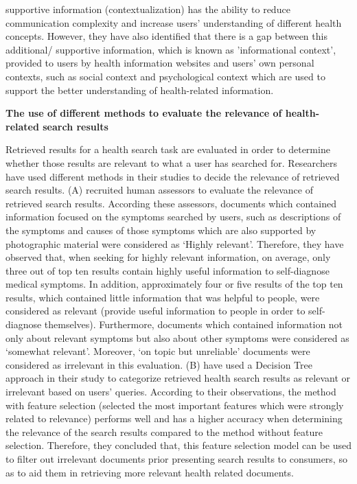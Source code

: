 \documentclass[]{article}
\begin{document}
supportive information (contextualization) has the ability to reduce communication complexity and increase users' understanding of different health concepts. However, they have also identified that there is a gap between this additional/ supportive information, which is known as 'informational context', provided to users by health information websites and users' own personal contexts, such as social context and psychological context which are used to support the better understanding of health-related information.  

\textbf{The use of different methods to evaluate the relevance of health-related search results}

Retrieved results for a health search task are evaluated in order to determine whether those results are relevant to what a user has searched for. Researchers have used different methods in their studies to decide the relevance of retrieved search results. (A) recruited human assessors to evaluate the relevance of retrieved search results. According these assessors, documents which contained information focused on the symptoms searched by users, such as descriptions of the symptoms and causes of those symptoms which are also supported by photographic material were considered as ‘Highly relevant’. Therefore, they have observed that, when seeking for highly relevant information, on average, only three out of top ten results contain highly useful information to self-diagnose medical symptoms. In addition, approximately four or five results of the top ten results, which contained little information that was helpful to people, were considered as relevant (provide useful information to people in order to self-diagnose themselves). Furthermore, documents which contained information not only about relevant symptoms but also about other symptoms were considered as ‘somewhat relevant’. Moreover, ‘on topic but unreliable’ documents were considered as irrelevant in this evaluation. (B) have used a Decision Tree approach in their study to categorize retrieved health search results as relevant or irrelevant based on users' queries. According to their observations, the method with feature selection (selected the most important features which were strongly related to relevance) performs well and has a higher accuracy when determining the relevance of the search results compared to the method without feature selection. Therefore, they concluded that, this feature selection model can be used to filter out irrelevant documents prior presenting search results to consumers, so as to aid them in retrieving more relevant health related documents.     
\end{document}
